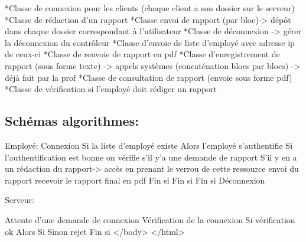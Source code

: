 \begin{DoxyPre}*Classe de connexion pour les clients (chaque client a son dossier sur le serveur)
*Classe de rédaction d'un rapport
*Classe envoi de rapport (par bloc)-> dépôt dans chaque dossier correspondant à l'utilisateur
*Classe de déconnexion -> gérer la déconnexion du contrôleur
*Classe d'envoie de liste d'employé avec adresse ip de ceux-ci
*Classe de renvoie de rapport en pdf 
*Classe d'enregistrement de rapport (sous forme texte) -> appels systèmes (concaténation blocs par blocs) -> déjà fait par la prof
*Classe de consultation de rapport (envoie sous forme pdf) 
*Classe de vérification si l'employé doit rédiger un rapport\end{DoxyPre}



\begin{DoxyPre}\subsection*{Schémas algorithmes:}\end{DoxyPre}



\begin{DoxyPre}
Employé:
Connexion
Si la liste d'employé existe
Alors l'employé s'authentifie
  Si l'authentification est bonne
        on vérifie s'il y'a une demande de rapport
        S'il y en a un
        rédaction du rapport-> accès en prenant le verrou de cette ressource
        envoi du rapport
        recevoir le rapport final en pdf
        Fin si
    Fin si
Fin si
Déconnexion\end{DoxyPre}



\begin{DoxyPre}Serveur:\end{DoxyPre}



\begin{DoxyPre}Attente d'une demande de connexion
Vérification de la connexion
Si vérification ok
Alors
    Si 
Sinon rejet
Fin si
    </body>
</html>
\end{DoxyPre}
